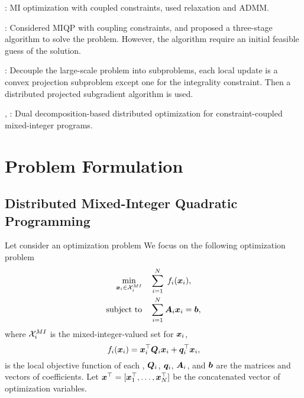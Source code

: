 \documentclass[twocolumn,amsthm]{autart}%
\theoremstyle{definition}
\newtheorem{definition}{Definition}
\theoremstyle{plain}
\begin{document}
\cite{liu2022distributed}: MI optimization with coupled constraints, used relaxation and ADMM.

\cite{liu2021distributed}: Considered MIQP with coupling constraints, and proposed a three-stage algorithm to solve the problem. However, the algorithm require an initial feasible guess of the solution.

\cite{sun2018distributed}: Decouple the large-scale problem into subproblems, each local update is a convex projection subproblem except one for the integrality constraint. Then a distributed projected subgradient algorithm is used.

\cite{yfantis2023hierarchical}, \cite{klostermeier2024numerical}: Dual decomposition-based distributed optimization for constraint-coupled mixed-integer programs.


\section{Problem Formulation}

\subsection{Distributed Mixed-Integer Quadratic Programming}

Let consider an optimization problem
We focus on the following optimization problem
\begin{equation}
\begin{split}
\underset{\boldsymbol{x}_i \in \mathcal{X}_i^{\relax{MI}}}{\min} & \quad \sum_{i=1}^N \; f_i (\boldsymbol{x}_i), \\
\text{subject to} & \quad \sum_{i=1}^N \boldsymbol{A}_{i} \boldsymbol{x}_i = \boldsymbol{b}, \\
\end{split}
\end{equation}
where $\mathcal{X}_i^{\relax{MI}}$ is the mixed-integer-valued set for $\boldsymbol{x}_i$,
\[
f_i (\boldsymbol{x}_i) = \boldsymbol{x}_i^\top \boldsymbol{Q}_i \boldsymbol{x}_i + \boldsymbol{q}_i^\top \boldsymbol{x}_i,
\]
is the local objective function of each ,
$\boldsymbol{Q}_i$, $\boldsymbol{q}_i$, $\boldsymbol{A}_{i}$, and $\boldsymbol{b}$ are the matrices and vectors of coefficients.
Let $\boldsymbol{x}^\top = [\boldsymbol{x}_1^\top, \dots, \boldsymbol{x}_N^\top]$ be the concatenated vector of optimization variables.

\end{document}
